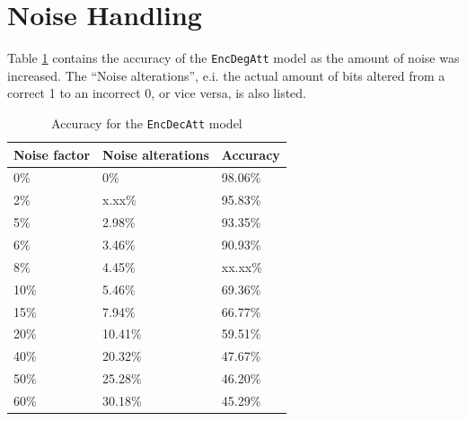 \section{Noise Handling}
\label{sec:noise_handling}
Table \ref{table:noise_accuracy} contains the accuracy of the {\tt EncDegAtt} model as the amount of noise was increased. The ``Noise alterations'', e.i. the actual amount of bits altered from a correct 1 to an incorrect 0, or vice versa, is also listed. 

\begin{table}[H]
    \centering
    \begin{tabular}{|l|l|l|}
        \hline 
        \textbf{Noise factor}          & \textbf{Noise alterations}       & \textbf{Accuracy}         \\ \hline
        0\%                            & 0\%                              & 98.06\%                   \\ \hline
        2\%                            & x.xx\%                           & 95.83\%                   \\ \hline
        5\%                            & 2.98\%                           & 93.35\%                   \\ \hline
        6\%                            & 3.46\%                           & 90.93\%                   \\ \hline
        8\%                            & 4.45\%                           & xx.xx\%                   \\ \hline
        10\%                           & 5.46\%                           & 69.36\%                   \\ \hline
        15\%                           & 7.94\%                           & 66.77\%                   \\ \hline
        20\%                           & 10.41\%                          & 59.51\%                   \\ \hline
        40\%                           & 20.32\%                          & 47.67\%                   \\ \hline
        50\%                           & 25.28\%                          & 46.20\%                   \\ \hline
        60\%                           & 30.18\%                          & 45.29\%                   \\ \hline
    \end{tabular}
    \caption{Accuracy for the {\tt EncDecAtt} model}
    \label{table:noise_accuracy}
\end{table}

